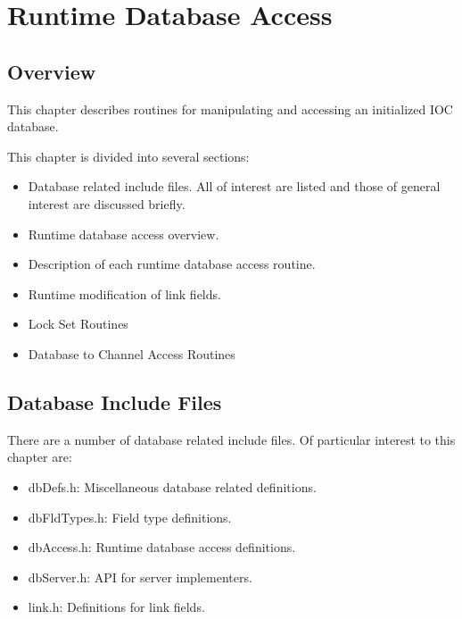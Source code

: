 \chapter{Runtime Database Access}
\label{chap:Runtime Database Access}

\section{Overview}

This chapter describes routines for manipulating and accessing an initialized IOC database.

This chapter is divided into several sections:

\begin{itemize}

\item Database related include files.
All of interest are listed and those of general interest are discussed briefly.

\item Runtime database access overview.

\item Description of each runtime database access routine.

\item Runtime modification of link fields.

\item Lock Set Routines

\item Database to Channel Access Routines

\end{itemize}

\section{Database Include Files}

There are a number of database related include files.
Of particular interest to this chapter are:

\begin{itemize}

\item {}dbDefs.h: Miscellaneous database related definitions.

\item {}dbFldTypes.h: Field type definitions.

\item {}dbAccess.h: Runtime database access definitions.

\item {}dbServer.h: API for server implementers.

\item {}link.h: Definitions for link fields.

\end{itemize}

